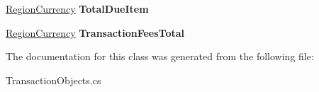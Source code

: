 \begin{DoxyCompactItemize}
\mbox{\hyperlink{class_golf_now_a_p_i_handler_1_1_region_currency}{Region\+Currency}} {\bfseries Total\+Due\+Item}
\item 
\mbox{\label{class_golf_now_a_p_i_handler_1_1_single_player_price_ab0c22c7a1cfb34d451095cda3be1f397}} 
\mbox{\hyperlink{class_golf_now_a_p_i_handler_1_1_region_currency}{Region\+Currency}} {\bfseries Transaction\+Fees\+Total}
\end{DoxyCompactItemize}


The documentation for this class was generated from the following file\+:\begin{DoxyCompactItemize}
\item 
Transaction\+Objects.\+cs\end{DoxyCompactItemize}
